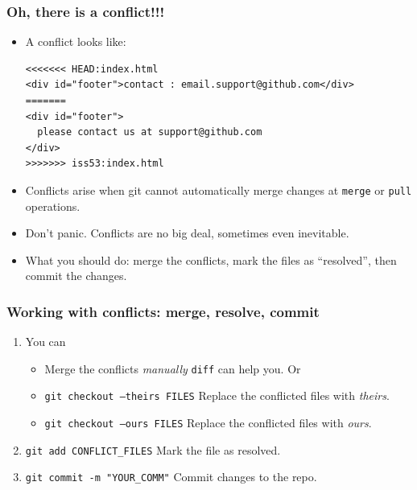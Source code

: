 \documentclass[11pt,ignorenonframetext,]{beamer}
\begin{document}
\begin{frame}[fragile, label=gitconflict]\frametitle{Oh, there is a conflict!!!}

\begin{itemize}
\item
  A conflict looks like:

{\small
\begin{verbatim}
<<<<<<< HEAD:index.html
<div id="footer">contact : email.support@github.com</div>
=======
<div id="footer">
  please contact us at support@github.com
</div>
>>>>>>> iss53:index.html
\end{verbatim}
}

\item
  Conflicts arise when git cannot automatically merge changes at
  \texttt{merge} or \texttt{pull} operations.
\item
  Don't panic. Conflicts are no big deal, sometimes even inevitable.
\item
  What you should do: merge the conflicts, mark the files as
  ``resolved'', then commit the changes.
\end{itemize}
\end{frame}

\begin{frame}[fragile]\frametitle{Working with conflicts: merge,
resolve, commit}

\begin{enumerate}[1.]
\item You can
  \begin{itemize}
	  \item Merge the conflicts \emph{manually} \texttt{diff} can help you. Or
	  \item \texttt{git checkout --theirs FILES} Replace the conflicted files with \emph{theirs}.
	  \item \texttt{git checkout --ours FILES} Replace the conflicted files with \emph{ours}.
  \end{itemize}
\item
  \texttt{git add CONFLICT\_FILES} Mark the file as resolved.
\item
  \texttt{git commit -m "YOUR\_COMM"} Commit changes to the repo.
\end{enumerate}
\end{frame}
\end{document}
